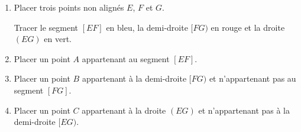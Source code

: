 \documentclass[a4paper,10pt]{report}
\begin{document}
\begin{ex}

\medskip
\begin{enumerate}
\item Placer trois points non alignés $E$, $F$ et $G$. 

Tracer le segment $[EF]$ en bleu, la demi-droite $[FG)$ en rouge et la droite $(EG)$ en vert.
\item Placer un point $A$ appartenant au segment $[EF]$.
\item Placer un point $B$ appartenant à la demi-droite $[FG)$ et n'appartenant pas au segment $[FG]$.
\item Placer un point $C$ appartenant à la droite $(EG)$ et n'appartenant pas à la demi-droite $[EG)$.
\end{enumerate}
\end{ex}
\end{document}
